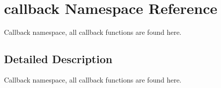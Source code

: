\hypertarget{namespacecallback}{
\section{callback Namespace Reference}
\label{namespacecallback}
}


Callback namespace, all callback functions are found here.  




\subsection{Detailed Description}
Callback namespace, all callback functions are found here. 